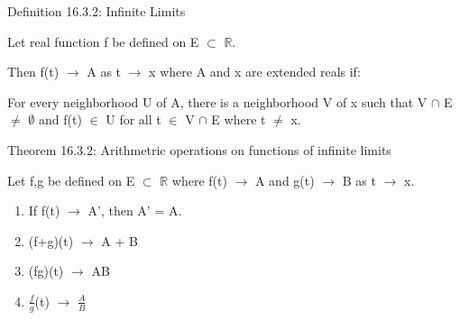     \vspace{0.5cm}

{ \color{blue} Definition 16.3.2: Infinite Limits }

    \begin{adjustbox}{minipage=14cm, right, vspace=0.1cm 0cm}
        Let real function f be defined on E $\subset$ $\mathbb{R}$.

        Then f(t) $\rightarrow$ A as t $\rightarrow$ x where A and x
        are extended reals if:
        
        \begin{adjustbox}{minipage=13cm, right, vspace=0.1cm 0cm}
            For every neighborhood U of A,
            there is a neighborhood V of x such that V $\cap$ E $\not =$ $\emptyset$
            and f(t) $\in$ U for all t $\in$ V $\cap$ E where t $\not =$ x.
        \end{adjustbox}
    \end{adjustbox}

    \vspace{0.5cm}

{ \color{red} Theorem 16.3.2: Arithmetric operations on functions of infinite limits }

    \begin{adjustbox}{minipage=14cm, right, vspace=0.1cm 0cm}
        Let f,g be defined on E $\subset$ $\mathbb{R}$ where
        f(t) $\rightarrow$ A and g(t) $\rightarrow$ B as t $\rightarrow$ x.

        \begin{enumerate}[label=(\alph*), leftmargin=2cm, itemsep=0.1cm]
            \item If f(t) $\rightarrow$ A', then A' = A.
            
            \item (f+g)(t) $\rightarrow$ A + B
            
            \item (fg)(t) $\rightarrow$ AB
            
            \item $\frac{f}{g}$(t) $\rightarrow$ $\frac{A}{B}$
        \end{enumerate}
    \end{adjustbox}